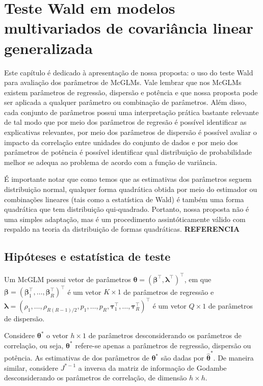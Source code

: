 
\chapter{Teste Wald em modelos multivariados de covariância linear generalizada}

Este capítulo é dedicado à apresentação de nossa proposta: o uso do teste Wald para avaliação dos parâmetros de McGLMs. Vale lembrar que nos McGLMs existem parâmetros de regressão, dispersão e potência e que nossa proposta pode ser aplicada a qualquer parâmetro ou combinação de parâmetros. Além disso, cada conjunto de parâmetros possui uma interpretação prática bastante relevante de tal modo que por meio dos parâmetros de regresão é possível identificar as explicativas relevantes, por meio dos parâmetros de dispersão é possível avaliar o impacto da correlação entre unidades do conjunto de dados e por meio dos parâmetros de potência é possível identificar qual distribuição de probabilidade melhor se adequa ao problema de acordo com a função de variância.

É importante notar que como temos que as estimativas dos parâmetros seguem distribuição normal, qualquer forma quadrática obtida por meio do estimador ou combinações lineares (tais como a estatística de Wald) é também uma forma quadrática que tem distribuição qui-quadrado. Portanto, nossa proposta não é uma simples adaptação, mas é um procedimento assintóticamente válido com respaldo na teoria da distribuição de formas quadráticas. \textbf{REFERENCIA}


\section{Hipóteses e estatística de teste}

Um McGLM possui vetor de parâmetros $\boldsymbol{\theta} = (\boldsymbol{\beta}^{\top}, \boldsymbol{\lambda}^{\top})^{\top}$, em que $\boldsymbol{\beta} = (\boldsymbol{\beta}_1^\top, \ldots, \boldsymbol{\beta}_R^\top)^\top$ é um vetor $K \times 1$ de parâmetros de regressão e $\boldsymbol{\lambda} = (\rho_1, \ldots, \rho_{R(R-1)/2}, p_1, \ldots, p_R, \boldsymbol{\tau}_1^\top, \ldots, \boldsymbol{\tau}_R^\top)^\top$ é um vetor $Q \times 1$ de parâmetros de dispersão.

Considere $\boldsymbol{\theta^{*}}$ o vetor $h \times 1$ de parâmetros desconsiderando os parâmetros de correlação, ou seja, $\boldsymbol{\theta^{*}}$ refere-se apenas a parâmetros de regressão, dispersão ou potência. As estimativas de dos parâmetros de $\boldsymbol{\theta^{*}}$ são dadas por $\boldsymbol{\hat\theta^{*}}$. De maneira similar, considere $J^{\boldsymbol{*}-1}$ a inversa da matriz de informação de Godambe desconsiderando os parâmetros de correlação, de dimensão $h \times h$.

